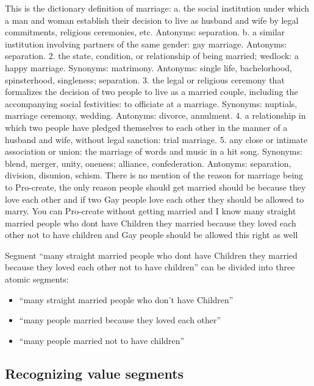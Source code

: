 \begin{mydef}
This is the dictionary definition of marriage:   a.   the social institution
under which a man and woman establish their decision to live as husband and
wife by legal commitments, religious ceremonies, etc. Antonyms: separation.
b.   a similar institution involving partners of the same gender: gay marriage.
Antonyms: separation.   2.   the state, condition, or relationship of being
married; wedlock: a happy marriage. Synonyms: matrimony. Antonyms: single life,
bachelorhood, spinsterhood, singleness; separation.   3.   the legal or
religious ceremony that formalizes the decision of two people to live as a
married couple, including the accompanying social festivities: to officiate at
a marriage. Synonyms: nuptials, marriage ceremony, wedding. Antonyms: divorce,
annulment.   4.   a relationship in which two people have pledged themselves to
each other in the manner of a husband and wife, without legal sanction: trial
marriage.   5.   any close or intimate association or union: the marriage of
words and music in a hit song. Synonyms: blend, merger, unity, oneness;
alliance, confederation. Antonyms: separation, division, disunion, schism.
There is no mention of the reason for marriage being to Pro-create, the only
reason people should get married should be because they love each other and if
two Gay people love each other they should be allowed to marry. You can
Pro-create without getting married and I know many straight married people who
dont have Children they married because they loved each other not to have
children and Gay people should be allowed this right as well
\end{mydef}
Segment ``many straight married people who dont have Children they married
because they loved each other not to have children''
can be divided into three atomic segments:
\begin{itemize}
\item[] ``many straight married people who don't have Children''
\item[] ``many people married because they loved each other''
\item[] ``many people married not to have children''
\end{itemize}

\subsection*{Recognizing value segments}

